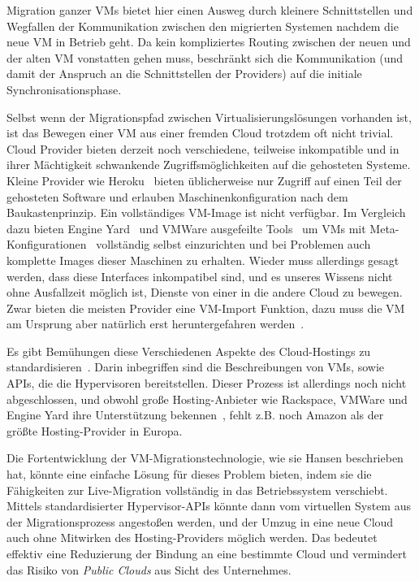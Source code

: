 Migration ganzer VMs bietet hier einen Ausweg durch kleinere
Schnittstellen und Wegfallen der Kommunikation zwischen den migrierten
Systemen nachdem die neue VM in Betrieb geht. Da kein kompliziertes
Routing zwischen der neuen und der alten VM vonstatten gehen muss,
beschränkt sich die Kommunikation (und damit der Anspruch an die
Schnittstellen der Providers) auf die initiale Synchronisationsphase.

Selbst wenn der Migrationspfad zwischen Virtualisierungslösungen
vorhanden ist, ist das Bewegen einer VM aus einer fremden Cloud
trotzdem oft nicht trivial. Cloud Provider bieten derzeit noch
verschiedene, teilweise inkompatible und in ihrer Mächtigkeit
schwankende Zugriffsmöglichkeiten auf die gehosteten Systeme. Kleine
Provider wie Heroku~\cite{heroku} bieten üblicherweise nur Zugriff auf
einen Teil der gehosteten Software und erlauben Maschinenkonfiguration
nach dem Baukastenprinzip. Ein vollständiges VM-Image ist nicht
verfügbar. Im Vergleich dazu bieten Engine Yard~\cite{engineyard} und
VMWare ausgefeilte Tools~\cite{engineyard-cli} um VMs mit
Meta-Konfigurationen~\cite{opscode-chef} vollständig selbst
einzurichten und bei Problemen auch komplette Images dieser Maschinen
zu erhalten. Wieder muss allerdings gesagt werden, dass diese
Interfaces inkompatibel sind, und es unseres Wissens nicht ohne
Ausfallzeit möglich ist, Dienste von einer in die andere Cloud zu
bewegen. Zwar bieten die meisten Provider eine VM-Import Funktion,
dazu muss die VM am Ursprung aber natürlich erst heruntergefahren
werden~\cite{amazon-import}.

Es gibt Bemühungen diese Verschiedenen Aspekte des Cloud-Hostings zu
standardisieren~\cite{cloudstandard}. Darin inbegriffen sind die
Beschreibungen von VMs, sowie APIs, die die Hypervisoren
bereitstellen. Dieser Prozess ist allerdings noch nicht abgeschlossen,
und obwohl große Hosting-Anbieter wie Rackspace, VMWare und Engine
Yard ihre Unterstützung bekennen~\cite{openstack}, fehlt z.B. noch
Amazon als der größte Hosting-Provider in Europa.

Die Fortentwicklung der VM-Migrationstechnologie, wie sie Hansen
beschrieben hat, könnte eine einfache Lösung für dieses Problem
bieten, indem sie die Fähigkeiten zur Live-Migration vollständig in
das Betriebssystem verschiebt. Mittels standardisierter
Hypervisor-APIs könnte dann vom virtuellen System aus der
Migrationsprozess angestoßen werden, und der Umzug in eine neue Cloud
auch ohne Mitwirken des Hosting-Providers möglich werden. Das bedeutet
effektiv eine Reduzierung der Bindung an eine bestimmte Cloud und
vermindert das Risiko von \emph{Public Clouds} aus Sicht des
Unternehmes.

